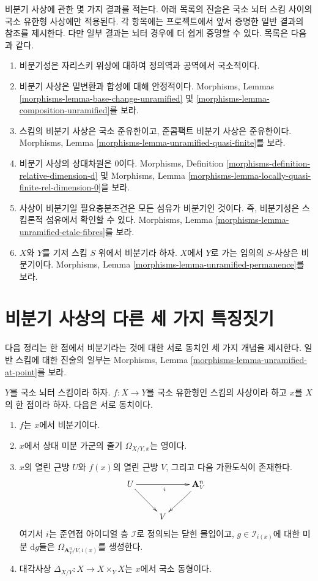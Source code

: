 \noindent
비분기 사상에 관한 몇 가지 결과를 적는다. 아래 목록의 진술은
국소 뇌터 스킴 사이의 국소 유한형 사상에만 적용된다. 각 항목에는
프로젝트에서 앞서 증명한 일반 결과의 참조를 제시한다. 다만 일부
결과는 뇌터 경우에 더 쉽게 증명할 수 있다. 목록은 다음과 같다.
\begin{enumerate}
\item 비분기성은 자리스키 위상에 대하여 정의역과 공역에서 국소적이다.
\item 비분기 사상은 밑변환과 합성에 대해 안정적이다. Morphisms, Lemmas
\ref{morphisms-lemma-base-change-unramified} 및
\ref{morphisms-lemma-composition-unramified}를 보라.
\item 스킴의 비분기 사상은 국소 준유한이고, 준콤팩트 비분기 사상은
준유한이다. Morphisms, Lemma
\ref{morphisms-lemma-unramified-quasi-finite}를 보라.
\item 비분기 사상의 상대차원은 $0$이다. Morphisms, Definition
\ref{morphisms-definition-relative-dimension-d} 및 Morphisms, Lemma
\ref{morphisms-lemma-locally-quasi-finite-rel-dimension-0}을 보라.
\item 사상이 비분기일 필요충분조건은 모든 섬유가 비분기인 것이다.
즉, 비분기성은 스킴론적 섬유에서 확인할 수 있다. Morphisms, Lemma
\ref{morphisms-lemma-unramified-etale-fibres}를 보라.
\item $X$와 $Y$를 기저 스킴 $S$ 위에서 비분기라 하자.
$X$에서 $Y$로 가는 임의의 $S$-사상은 비분기이다.
Morphisms, Lemma \ref{morphisms-lemma-unramified-permanence}를 보라.
\end{enumerate}

\section{비분기 사상의 다른 세 가지 특징짓기}
\label{section-three-other}

\noindent
다음 정리는 한 점에서 비분기라는 것에 대한 서로 동치인 세 가지
개념을 제시한다. 일반 스킴에 대한 진술의 일부는 Morphisms, Lemma
\ref{morphisms-lemma-unramified-at-point}를 보라.

\begin{theorem}
\label{theorem-unramified-equivalence}
$Y$를 국소 뇌터 스킴이라 하자. $f : X \to Y$를 국소 유한형인
스킴의 사상이라 하고 $x$를 $X$의 한 점이라 하자. 다음은 서로 동치이다.
\begin{enumerate}
\item $f$는 $x$에서 비분기이다.
\item $x$에서 상대 미분 가군의 줄기 $\Omega_{X/Y, x}$는 영이다.
\item $x$의 열린 근방 $U$와 $f(x)$의 열린 근방 $V$, 그리고 다음
가환도식이 존재한다.
$$
\xymatrix{
U \ar[rr]_i \ar[rd] & & \mathbf{A}^n_V \ar[ld] \\
& V
}
$$
여기서 $i$는 준연접 아이디얼 층 $\mathcal{I}$로 정의되는 닫힌 몰입이고,
$g \in \mathcal{I}_{i(x)}$에 대한 미분 $\text{d}g$들은
$\Omega_{\mathbf{A}^n_V/V, i(x)}$를 생성한다.
\item 대각사상 $\Delta_{X/Y} : X \to X \times_Y X$는 $x$에서
국소 동형이다.
\end{enumerate}
\end{theorem}

